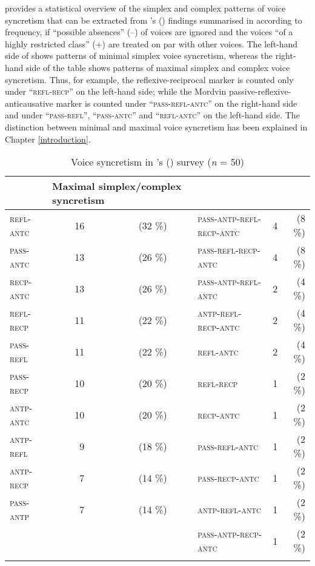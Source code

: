  provides a statistical overview of the simplex and complex patterns of voice syncretism that can be extracted from \citeauthor{geniusiene:1987}’s (\citeyear{geniusiene:1987}) findings summarised in  according to frequency, if “possible absences” (--) of voices are ignored and the voices “of a highly restricted class” (+) are treated on par with other voices. The left-hand side of  shows patterns of minimal simplex voice syncretism, whereas the right-hand side of the table shows patterns of maximal simplex and complex voice syncretism. Thus, for example, the  reflexive-reciprocal marker  is counted only under “\textsc{refl-recp}” on the left-hand side; while the Mordvin passive-reflexive-anticausative marker  is counted under “\textsc{pass-refl-antc}” on the right-hand side and under “\textsc{pass-refl}”, “\textsc{pass-antc}” and “\textsc{refl-antc}” on the left-hand side. The distinction between minimal and maximal voice syncretism has been explained in Chapter \ref{introduction}.

\begin{table}
	\begin{tabularx}{.92\textwidth}{lrrrlrr}
		\lsptoprule
		\multicolumn{4}{l}{Minimal simplex syncretism} & \multicolumn{3}{l}{Maximal simplex/complex syncretism} \\
		\midrule
		\textsc{refl-antc} & 16 & (32 \%) & & \textsc{pass-antp-refl-recp-antc} & 4 & (8 \%) \\
		\textsc{pass-antc} & 13 & (26 \%) & & \textsc{pass-refl-recp-antc} & 4 & (8 \%) \\
		\textsc{recp-antc} & 13 & (26 \%) & & \textsc{pass-antp-refl-antc} & 2 & (4 \%) \\
		\textsc{refl-recp} & 11 & (22 \%) & & \textsc{antp-refl-recp-antc} &  2 & (4 \%) \\
		\textsc{pass-refl} & 11 & (22 \%) & & \textsc{refl-antc} & 2 & (4 \%) \\
		\textsc{pass-recp} & 10 & (20 \%) & & \textsc{refl-recp} & 1 & (2 \%) \\
		\textsc{antp-antc} & 10 & (20 \%) & & \textsc{recp-antc} & 1 & (2 \%) \\
		\textsc{antp-refl} &  9 & (18 \%) & & \textsc{pass-refl-antc} &  1 & (2 \%) \\
		\textsc{antp-recp} &  7 & (14 \%) & & \textsc{pass-recp-antc} &  1 & (2 \%) \\
		\textsc{pass-antp} &  7 & (14 \%) & & \textsc{antp-refl-antc} &  1 & (2 \%) \\
		& & & & \textsc{pass-antp-recp-antc} & 1 & (2 \%) \\
		\lspbottomrule
	\end{tabularx}
	\caption{Voice syncretism in \citeauthor{geniusiene:1987}’s (\citeyear{geniusiene:1987}) survey (\textit{n} = 50)}
	\label{tab:ch3:geniusiene-patterns}
\end{table}  

